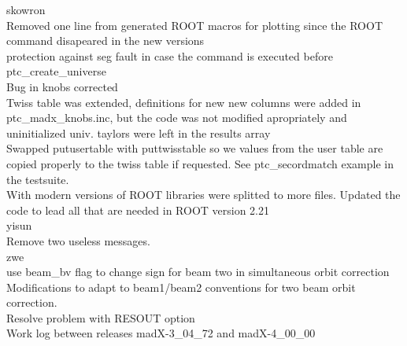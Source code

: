 skowron \\ 
Removed one line from generated ROOT macros for plotting since the ROOT command disapeared in the new versions  \\ 
protection against seg fault in case the command is executed before ptc\_create\_universe  \\ 
Bug in knobs corrected  \\ 
Twiss table was extended, definitions for new new columns were added in ptc\_madx\_knobs.inc, but the code was not modified apropriately and uninitialized univ. taylors were left in the results array  \\ 
Swapped putusertable with puttwisstable so we values from the user table are copied properly to the twiss table if requested. See ptc\_secordmatch example in the testsuite.  \\ 
With modern versions of ROOT libraries were splitted to more files. Updated the code to lead all that are needed in ROOT version 2.21  \\ 
yisun \\ 
Remove two useless messages.  \\ 
zwe \\ 
 use beam\_bv flag to change sign for beam two in simultaneous orbit correction  \\ 
Modifications to adapt to beam1/beam2 conventions for two beam orbit correction.  \\ 
Resolve problem with RESOUT option 
\\

Work log between releases madX-3\_04\_72 and madX-4\_00\_00 

